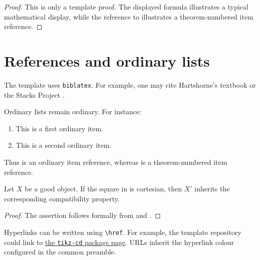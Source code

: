 \documentclass[12pt,a4paper]{amsart}
\begin{document}
\begin{proof}
This is only a template proof. The displayed formula illustrates a typical
mathematical display, while the reference to
 illustrates a theorem-numbered item reference.
\end{proof}

\section{References and ordinary lists}

The template uses \texttt{biblatex}. For example, one may cite
Hartshorne's textbook \cite{har77} or the Stacks Project \cite{stacks}.

Ordinary lists remain ordinary. For instance:
\begin{enumerate}[label=(\alph*), ref=(\alph*)]
  \item \label{item:ordinary-first} This is a first ordinary item.
  \item \label{item:ordinary-second} This is a second ordinary item.
\end{enumerate}
Thus  is an ordinary item reference, whereas
 is a theorem-numbered item reference.

\begin{proposition}\label{proposition:main}
Let \(X\) be a good object. If the square in  is
cartesian, then \(X'\) inherits the corresponding compatibility property.
\end{proposition}

\begin{proof}
The assertion follows formally from  and
.
\end{proof}

\begin{remark}\label{remark:links}
Hyperlinks can be written using \verb|\href|. For example, the template
repository could link to
\href{https://www.ctan.org/pkg/tikz-cd}{the \texttt{tikz-cd} package page}.
URLs inherit the hyperlink colour configured in the common preamble.
\end{remark}

\printbibliography
\end{document}
